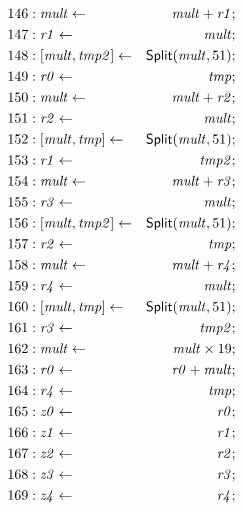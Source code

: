 {\begin{multicols}{2}
\begin{align*}
146 &: \mathit{mult} \leftarrow & \mathit{mult} + \mathit{r1}; \\
147 &: \mathit{r1} \leftarrow & \mathit{mult}; \\
148 &: {[}{\mathit{mult}}, {\mathit{tmp2}}{]} \leftarrow & \mbox{\textsf{Split}}(\mathit{mult}, 51); \\
149 &: \mathit{r0} \leftarrow & \mathit{tmp}; \\
150 &: \mathit{mult} \leftarrow & \mathit{mult} + \mathit{r2}; \\
151 &: \mathit{r2} \leftarrow & \mathit{mult}; \\
152 &: {[}{\mathit{mult}}, {\mathit{tmp}}{]} \leftarrow & \mbox{\textsf{Split}}(\mathit{mult}, 51); \\
153 &: \mathit{r1} \leftarrow & \mathit{tmp2}; \\
154 &: \mathit{mult} \leftarrow & \mathit{mult} + \mathit{r3}; \\
155 &: \mathit{r3} \leftarrow & \mathit{mult}; \\
156 &: {[}{\mathit{mult}}, {\mathit{tmp2}}{]} \leftarrow & \mbox{\textsf{Split}}(\mathit{mult}, 51); \\
157 &: \mathit{r2} \leftarrow & \mathit{tmp}; \\
158 &: \mathit{mult} \leftarrow & \mathit{mult} + \mathit{r4}; \\
159 &: \mathit{r4} \leftarrow & \mathit{mult}; \\
160 &: {[}{\mathit{mult}}, {\mathit{tmp}}{]} \leftarrow & \mbox{\textsf{Split}}(\mathit{mult}, 51); \\
161 &: \mathit{r3} \leftarrow & \mathit{tmp2}; \\
162 &: \mathit{mult} \leftarrow & \mathit{mult} \times 19; \\
163 &: \mathit{r0} \leftarrow & \mathit{r0} + \mathit{mult}; \\
164 &: \mathit{r4} \leftarrow & \mathit{tmp}; \\
165 &: \mathit{z0} \leftarrow & \mathit{r0}; \\
166 &: \mathit{z1} \leftarrow & \mathit{r1}; \\
167 &: \mathit{z2} \leftarrow & \mathit{r2}; \\
168 &: \mathit{z3} \leftarrow & \mathit{r3}; \\
169 &: \mathit{z4} \leftarrow & \mathit{r4}; \\
\end{align*}
\end{multicols}
}

